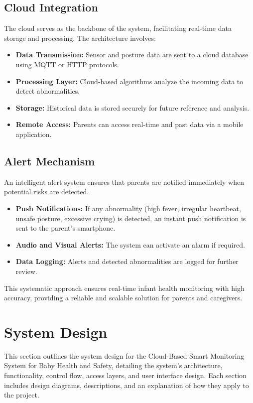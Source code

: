 \documentclass[conference]{IEEEtran}
\begin{document}
\subsection{Cloud Integration}
The cloud serves as the backbone of the system, facilitating real-time data storage and processing. The architecture involves:
\begin{itemize}
    \item \textbf{Data Transmission:} Sensor and posture data are sent to a cloud database using MQTT or HTTP protocols.
    \item \textbf{Processing Layer:} Cloud-based algorithms analyze the incoming data to detect abnormalities.
    \item \textbf{Storage:} Historical data is stored securely for future reference and analysis.
    \item \textbf{Remote Access:} Parents can access real-time and past data via a mobile application.
\end{itemize}

\subsection{Alert Mechanism}
An intelligent alert system ensures that parents are notified immediately when potential risks are detected.
\begin{itemize}
    \item \textbf{Push Notifications:} If any abnormality (high fever, irregular heartbeat, unsafe posture, excessive crying) is detected, an instant push notification is sent to the parent’s smartphone.
    \item \textbf{Audio and Visual Alerts:} The system can activate an alarm if required.
    \item \textbf{Data Logging:} Alerts and detected abnormalities are logged for further review.
\end{itemize}

This systematic approach ensures real-time infant health monitoring with high accuracy, providing a reliable and scalable solution for parents and caregivers.


\section{System Design}
This section outlines the system design for the Cloud-Based Smart Monitoring System for Baby Health and Safety, detailing the system's architecture, functionality, control flow, access layers, and user interface design. Each section includes design diagrams, descriptions, and an explanation of how they apply to the project.
\end{document}

